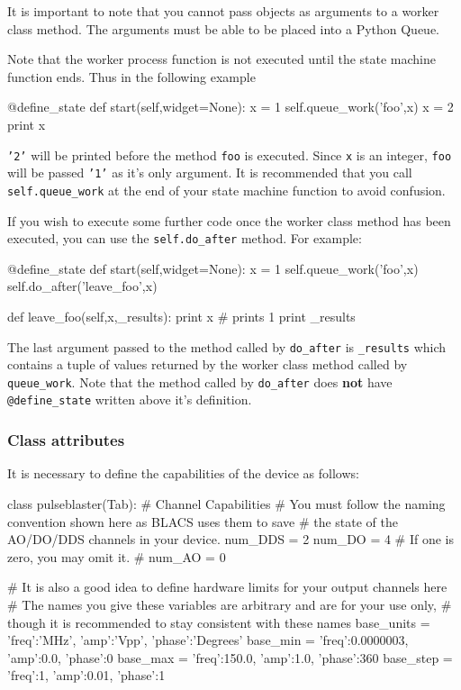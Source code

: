\documentclass[12pt]{article}
\begin{document}
It is important to note that you cannot pass objects as arguments to a worker class method. The arguments must be able to be placed into a Python Queue.

Note that the worker process function is not executed until the state machine function ends. Thus in the following example 
\begin{python}
    @define_state
    def start(self,widget=None):
        x = 1
        self.queue_work('foo',x)
        x = 2
        print x
\end{python}
\texttt{'2'} will be printed before the method \texttt{foo} is executed. Since \texttt{x} is an integer, \texttt{foo} will be passed \texttt{'1'} as it's only argument. It is recommended that you call \texttt{self.queue\_work} at the end of your state machine function to avoid confusion.

If you wish to execute some further code once the worker class method has been executed, you can use the \texttt{self.do\_after} method. For example:
\begin{python}
    @define_state
    def start(self,widget=None):
        x = 1
        self.queue_work('foo',x)
        self.do_after('leave_foo',x)
        
    def leave_foo(self,x,_results):
        print x # prints 1
        print _results
\end{python}
The last argument passed to the method called by \texttt{do\_after} is \texttt{\_results} which contains a tuple of values returned by the worker class method called by \texttt{queue\_work}. Note that the method called by \texttt{do\_after} does \textbf{not} have \texttt{@define\_state} written above it's definition.

\subsubsection{Class attributes}\label{device_class_attributes}
It is necessary to define the capabilities of the device as follows:
\begin{python}
class pulseblaster(Tab):
    # Channel Capabilities
    # You must follow the naming convention shown here as BLACS uses them to save
    # the state of the AO/DO/DDS channels in your device.
    num_DDS = 2
    num_DO = 4 
    # If one is zero, you may omit it.
    # num_AO = 0
    
    # It is also a good idea to define hardware limits for your output channels here
    # The names you give these variables are arbitrary and are for your use only,
    # though it is recommended to stay consistent with these names
    base_units = {'freq':'MHz',     'amp':'Vpp', 'phase':'Degrees'}
    base_min =   {'freq':0.0000003, 'amp':0.0,   'phase':0}
    base_max =   {'freq':150.0,     'amp':1.0,   'phase':360}
    base_step =  {'freq':1,         'amp':0.01,  'phase':1}
\end{python}
\end{document}
